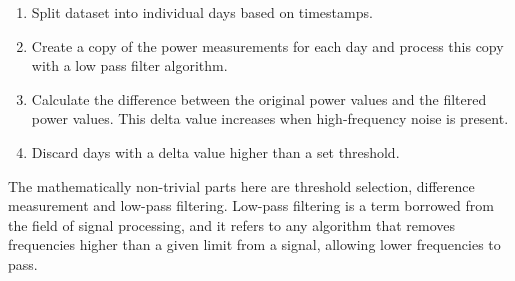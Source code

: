 





\begin{enumerate}
  \item Split dataset into individual days based on timestamps.
  
  \item Create a copy of the power measurements for each day and process this copy with a low pass filter algorithm.

  
  \item Calculate the difference between the original power values and the filtered power values. This delta value increases when high-frequency noise is present.
  
  
  \item Discard days with a delta value higher than a set threshold.
  

\end{enumerate}



\noindent The mathematically non-trivial parts here are threshold selection, difference measurement and low-pass filtering. Low-pass filtering is a term borrowed from the field of signal processing, and it refers to any algorithm that removes frequencies higher than a given limit from a signal, allowing lower frequencies to pass. 



